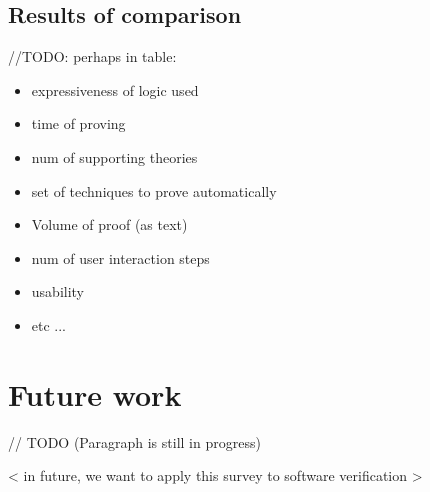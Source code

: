 \documentclass[article]{aaltoseries}
\begin{document}
\subsection{Results of comparison}
\label{sec:joint_comparison}

//TODO: perhaps in table:
\begin{itemize}
	\itemsep0em
	\item expressiveness of logic used
	\item time of proving
	\item num of supporting theories
	\item set of techniques to prove automatically
	\item Volume of proof (as text)
	\item num of user interaction steps
	\item usability
	\item etc ...
\end{itemize}



\section{Future work}
\label{sec:future_work}

// TODO (Paragraph is still in progress)

< in future, we want to apply this survey to software verification >





\end{document}
